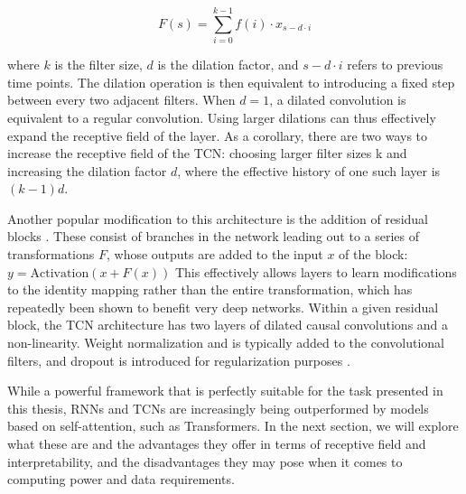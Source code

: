 \begin{equation}
F(s) = \sum_{i=0}^{k-1} f(i) \cdot x_{s-d \cdot i}
\label{eq:2.20}
\end{equation}

\noindent where $k$ is the filter size, $d$ is the dilation factor, and $s - d \cdot i$ refers to previous time points. The dilation operation is then equivalent to introducing a fixed step between every two adjacent filters. When $d = 1$, a dilated convolution is equivalent to a regular convolution. Using larger dilations can thus effectively expand the receptive field of the layer. As a corollary, there are two ways to increase the receptive field of the TCN: choosing larger filter sizes k and increasing the dilation factor $d$, where the effective history of one such layer is $(k - 1)d$.

Another popular modification to this architecture is the addition of residual blocks \cite{He2015DeepRecognition}. These consist of branches in the network leading out to a series of transformations $F$, whose outputs are added to the input $x$ of the block: $y = \mathrm{Activation}(x + F(x))$ This effectively allows layers to learn modifications to the identity mapping rather than the entire transformation, which has repeatedly been shown to benefit very deep networks. Within a given residual block, the TCN architecture has two layers of dilated causal convolutions and a non-linearity. Weight normalization and is typically added to the convolutional filters, and dropout is introduced for regularization purposes \cite{Bai2018AnModeling}.

While a powerful framework that is perfectly suitable for the task presented in this thesis, RNNs and TCNs are increasingly being outperformed by models based on self-attention, such as Transformers. In the next section, we will explore what these are and the advantages they offer in terms of receptive field and interpretability, and the disadvantages they may pose when it comes to computing power and data requirements.

